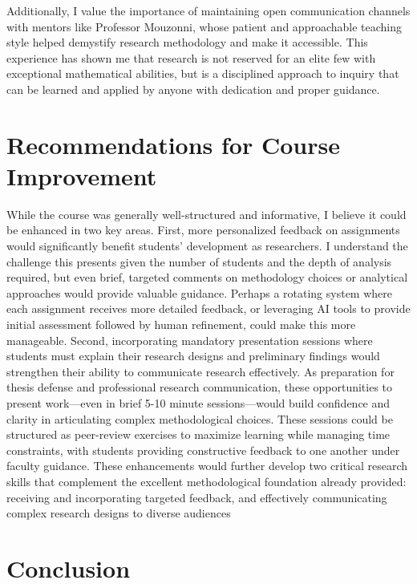 \documentclass[
]{article}
\begin{document}
Additionally, I value the importance of maintaining open communication
channels with mentors like Professor Mouzonni, whose patient and
approachable teaching style helped demystify research methodology and
make it accessible. This experience has shown me that research is not
reserved for an elite few with exceptional mathematical abilities, but
is a disciplined approach to inquiry that can be learned and applied by
anyone with dedication and proper guidance.

\section{Recommendations for Course
Improvement}\label{recommendations-for-course-improvement}

While the course was generally well-structured and informative, I
believe it could be enhanced in two key areas. First, more personalized
feedback on assignments would significantly benefit students'
development as researchers. I understand the challenge this presents
given the number of students and the depth of analysis required, but
even brief, targeted comments on methodology choices or analytical
approaches would provide valuable guidance. Perhaps a rotating system
where each assignment receives more detailed feedback, or leveraging AI
tools to provide initial assessment followed by human refinement, could
make this more manageable. Second, incorporating mandatory presentation
sessions where students must explain their research designs and
preliminary findings would strengthen their ability to communicate
research effectively. As preparation for thesis defense and professional
research communication, these opportunities to present work---even in
brief 5-10 minute sessions---would build confidence and clarity in
articulating complex methodological choices. These sessions could be
structured as peer-review exercises to maximize learning while managing
time constraints, with students providing constructive feedback to one
another under faculty guidance. These enhancements would further develop
two critical research skills that complement the excellent
methodological foundation already provided: receiving and incorporating
targeted feedback, and effectively communicating complex research
designs to diverse audiences

\section{Conclusion}\label{conclusion}
\end{document}
